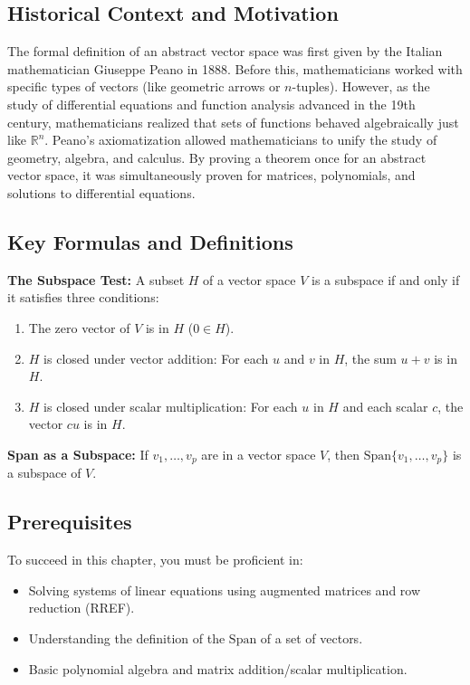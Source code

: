 \documentclass[12pt]{article}
\begin{document}
\subsection{Historical Context and Motivation}
The formal definition of an abstract vector space was first given by the Italian mathematician Giuseppe Peano in 1888. Before this, mathematicians worked with specific types of vectors (like geometric arrows or $n$-tuples). However, as the study of differential equations and function analysis advanced in the 19th century, mathematicians realized that sets of functions behaved algebraically just like $\mathbb{R}^n$. Peano's axiomatization allowed mathematicians to unify the study of geometry, algebra, and calculus. By proving a theorem once for an abstract vector space, it was simultaneously proven for matrices, polynomials, and solutions to differential equations.

\subsection{Key Formulas and Definitions}
\textbf{The Subspace Test:} A subset $H$ of a vector space $V$ is a subspace if and only if it satisfies three conditions:
\begin{enumerate}
    \item The zero vector of $V$ is in $H$ ($0 \in H$).
    \item $H$ is closed under vector addition: For each $u$ and $v$ in $H$, the sum $u + v$ is in $H$.
    \item $H$ is closed under scalar multiplication: For each $u$ in $H$ and each scalar $c$, the vector $cu$ is in $H$.
\end{enumerate}

\textbf{Span as a Subspace:} If $v_1, \dots, v_p$ are in a vector space $V$, then $\text{Span}\{v_1, \dots, v_p\}$ is a subspace of $V$.

\subsection{Prerequisites}
To succeed in this chapter, you must be proficient in:
\begin{itemize}
    \item Solving systems of linear equations using augmented matrices and row reduction (RREF).
    \item Understanding the definition of the $\text{Span}$ of a set of vectors.
    \item Basic polynomial algebra and matrix addition/scalar multiplication.
\end{itemize}
\end{document}
